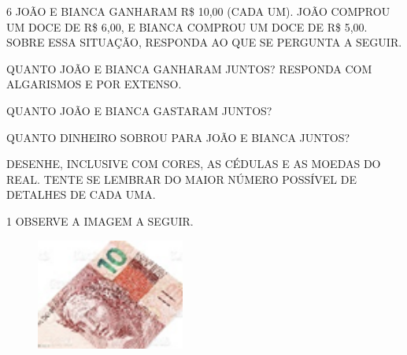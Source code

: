 
\num{6} JOÃO E BIANCA GANHARAM R\$ 10,00 (CADA UM). JOÃO COMPROU UM DOCE DE R\$ 6,00,
E BIANCA COMPROU UM DOCE DE R\$ 5,00. SOBRE ESSA SITUAÇÃO, RESPONDA AO QUE SE PERGUNTA A SEGUIR.

\begin{escolha}
\item QUANTO JOÃO E BIANCA GANHARAM JUNTOS? RESPONDA COM ALGARISMOS E POR EXTENSO.


\item QUANTO JOÃO E BIANCA GASTARAM JUNTOS?


\item QUANTO DINHEIRO SOBROU PARA JOÃO E BIANCA JUNTOS?


\item DESENHE, INCLUSIVE COM CORES, AS CÉDULAS E AS MOEDAS DO REAL. TENTE SE LEMBRAR DO MAIOR NÚMERO POSSÍVEL DE DETALHES DE CADA UMA.
\end{escolha}

\begin{mdframed}[linewidth=2pt,linecolor=salmao,roundcorner=10pt]
\vspace{13cm}
\end{mdframed}



\num{1} OBSERVE A IMAGEM A SEGUIR.


\begin{figure}[htpb!]
\centering
\includegraphics[width=1.92157in,height=1.43284in]{media/image75.png}
\end{figure}

